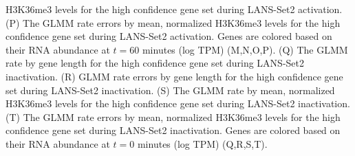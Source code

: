 \documentclass[11pt]{biorxiv}
\begin{document}
H3K36me3 levels for the high confidence gene set during LANS-Set2 activation. (P) The GLMM rate errors by mean, normalized H3K36me3 levels for the high confidence gene set during LANS-Set2 activation. Genes are colored based on their RNA abundance at $t=60$ minutes (log TPM) (M,N,O,P). (Q) The GLMM rate by gene length for the high confidence gene set during LANS-Set2 inactivation. (R) GLMM rate errors by gene length for the high confidence gene set during LANS-Set2 inactivation. (S) The GLMM rate by mean, normalized H3K36me3 levels for the high confidence gene set during LANS-Set2 inactivation. (T) The GLMM rate errors by mean, normalized H3K36me3 levels for the high confidence gene set during LANS-Set2 inactivation. Genes are colored based on their RNA abundance at $t=0$ minutes (log TPM) (Q,R,S,T). 

\clearpage
\end{document}
